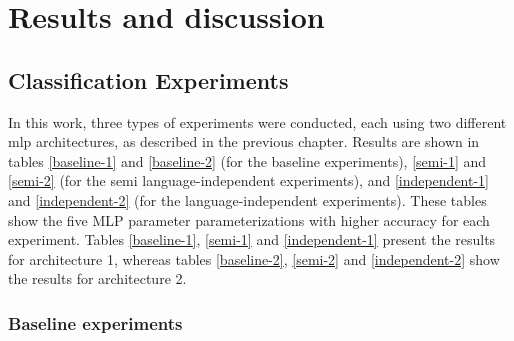
\chapter{Results and discussion}
\label{ch:omnisvoluptas}




\section{Classification Experiments}

In this work, three types of experiments were conducted, each using two different \gls{mlp} architectures, as described in the previous chapter. Results are shown in tables \ref{baseline-1} and \ref{baseline-2} (for the baseline experiments), \ref{semi-1} and \ref{semi-2} (for the semi language-independent experiments), and \ref{independent-1} and \ref{independent-2} (for the language-independent experiments). These tables show the five MLP parameter parameterizations with higher accuracy for each experiment. Tables \ref{baseline-1}, \ref{semi-1} and \ref{independent-1} present the results for architecture 1, whereas tables \ref{baseline-2}, \ref{semi-2} and \ref{independent-2} show the results for architecture 2.

\subsection{Baseline experiments}

